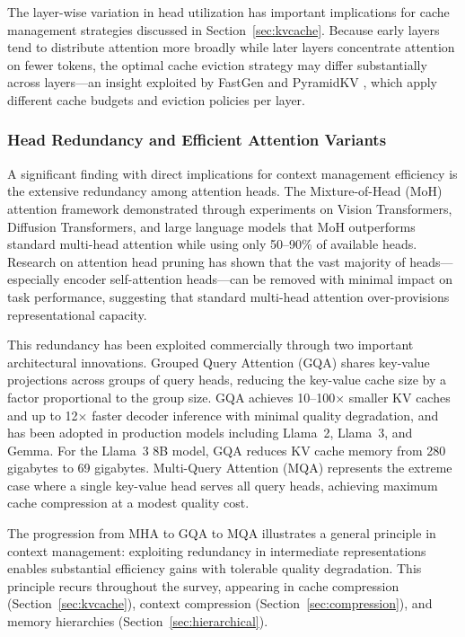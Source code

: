 \documentclass[11pt,letterpaper]{article}
\begin{document}
The layer-wise variation in head utilization has important implications for cache management strategies discussed in Section~\ref{sec:kvcache}. Because early layers tend to distribute attention more broadly while later layers concentrate attention on fewer tokens, the optimal cache eviction strategy may differ substantially across layers---an insight exploited by FastGen \cite{ge2024model} and PyramidKV \cite{cai2024pyramidkv}, which apply different cache budgets and eviction policies per layer.

\subsubsection{Head Redundancy and Efficient Attention Variants}

A significant finding with direct implications for context management efficiency is the extensive redundancy among attention heads. The Mixture-of-Head (MoH) attention framework demonstrated through experiments on Vision Transformers, Diffusion Transformers, and large language models that MoH outperforms standard multi-head attention while using only 50--90\% of available heads. Research on attention head pruning has shown that the vast majority of heads---especially encoder self-attention heads---can be removed with minimal impact on task performance, suggesting that standard multi-head attention over-provisions representational capacity.

This redundancy has been exploited commercially through two important architectural innovations. Grouped Query Attention (GQA) \cite{ainslie2023gqa} shares key-value projections across groups of query heads, reducing the key-value cache size by a factor proportional to the group size. GQA achieves 10--100$\times$ smaller KV caches and up to 12$\times$ faster decoder inference with minimal quality degradation, and has been adopted in production models including Llama~2, Llama~3, and Gemma. For the Llama~3 8B model, GQA reduces KV cache memory from 280 gigabytes to 69 gigabytes. Multi-Query Attention (MQA) \cite{shazeer2019fast} represents the extreme case where a single key-value head serves all query heads, achieving maximum cache compression at a modest quality cost.

The progression from MHA to GQA to MQA illustrates a general principle in context management: exploiting redundancy in intermediate representations enables substantial efficiency gains with tolerable quality degradation. This principle recurs throughout the survey, appearing in cache compression (Section~\ref{sec:kvcache}), context compression (Section~\ref{sec:compression}), and memory hierarchies (Section~\ref{sec:hierarchical}).
\end{document}
